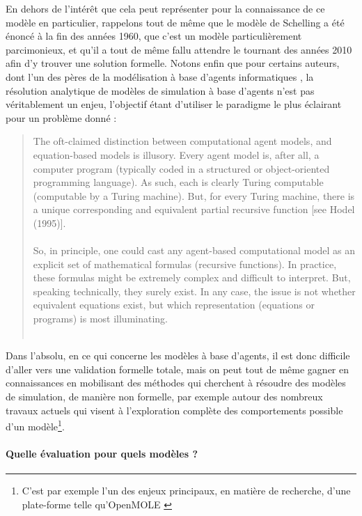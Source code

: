 En dehors de l'intérêt que cela peut représenter pour la connaissance de ce modèle en particulier, rappelons tout de même que le modèle de Schelling a été énoncé à la fin des années 1960, que c'est un modèle particulièrement parcimonieux, et qu'il a tout de même fallu attendre le tournant des années 2010 afin d'y trouver une solution formelle.
Notons enfin que pour certains auteurs, dont l'un des pères de la modélisation à base d'agents informatiques \textcite{epstein2006remarks}, la résolution analytique de modèles de simulation à base d'agents n'est pas véritablement un enjeu, l'objectif étant d'utiliser le paradigme le plus \og éclairant\fg{} pour un problème donné :
\begin{quotation}
	\noindent \og
	The oft-claimed distinction between computational agent models, and equation-based models is illusory.
	Every agent model is, after all, a computer program (typically coded in a structured or object-oriented programming language).
	As such, each is clearly Turing computable (computable by a Turing machine).
	But, for every Turing machine, there is a unique corresponding and equivalent partial recursive function [see Hodel (1995)].\\
	\textelp{}\\
	So, in principle, one could cast any agent-based computational model as an explicit set of mathematical formulas (recursive functions).
	In practice, these formulas might be extremely complex and difficult to interpret.
	But, speaking technically, they surely exist.\textelp{}
	In any case, the issue is not whether equivalent equations exist, but which representation (equations or programs) is most illuminating.
	\fg{}\\
	\mbox{}~ \hfill \textcite[1590-1591]{epstein2006remarks}
\end{quotation}

Dans l'absolu, en ce qui concerne les modèles à base d'agents, il est donc difficile d'aller vers une validation formelle totale, mais on peut tout de même gagner en connaissances en mobilisant des méthodes qui cherchent à \og résoudre \fg{} des modèles de simulation, de manière non formelle, par exemple autour des nombreux travaux actuels \autocite[par exemple][]{cherel_beyond_2015} qui visent à l'exploration complète des comportements possible d'un modèle\footnote{
	C'est par exemple l'un des enjeux principaux, en matière de recherche, d'une plate-forme telle qu'OpenMOLE \autocite{reuillon_openmole_2013}
}.

\paragraph{Quelle évaluation pour quels modèles ?}\label{par:quelle-eval-quel-modeles}

